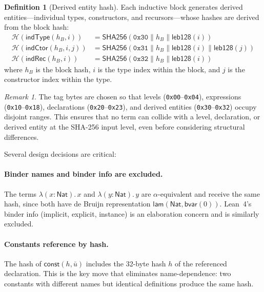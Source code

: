 \documentclass[11pt]{article}
\theoremstyle{definition}
\newtheorem{definition}{Definition}[section]
\theoremstyle{plain}
\theoremstyle{remark}
\newtheorem{remark}{Remark}[section]
\newcommand{\hash}{\mathcal{H}}
\newcommand{\SHA}{\textsf{SHA256}}
\newcommand{\Nat}{\textsf{Nat}}
\newcommand{\bvar}{\textsf{bvar}}
\newcommand{\const}{\textsf{const}}
\newcommand{\lam}{\textsf{lam}}
\newcommand{\concat}{\mathbin{\|}}
\begin{document}
\begin{definition}[Derived entity hash]
\label{def:hash-derived}
Each inductive block generates derived entities---individual types, constructors, and recursors---whose
hashes are derived from the block hash:
\begin{align*}
  \hash(\textsf{indType}(h_B, i)) &= \SHA(\mathtt{0x30} \concat h_B \concat \textsf{leb128}(i)) \\
  \hash(\textsf{indCtor}(h_B, i, j)) &= \SHA(\mathtt{0x31} \concat h_B \concat \textsf{leb128}(i) \concat \textsf{leb128}(j)) \\
  \hash(\textsf{indRec}(h_B, i)) &= \SHA(\mathtt{0x32} \concat h_B \concat \textsf{leb128}(i))
\end{align*}
where $h_B$ is the block hash, $i$ is the type index within the block, and $j$ is the constructor index within the type.
\end{definition}

\begin{remark}
The tag bytes are chosen so that levels (\texttt{0x00}--\texttt{0x04}),
expressions (\texttt{0x10}--\texttt{0x18}), declarations (\texttt{0x20}--\texttt{0x23}),
and derived entities (\texttt{0x30}--\texttt{0x32})
occupy disjoint ranges.
This ensures that no term can collide with a level, declaration, or derived entity at the SHA-256 input level,
even before considering structural differences.
\end{remark}

Several design decisions are critical:

\paragraph{Binder names and binder info are excluded.}
The terms $\lambda(x{:}\Nat).\,x$ and $\lambda(y{:}\Nat).\,y$ are $\alpha$-equivalent
and receive the same hash, since both have de Bruijn representation
$\lam(\Nat, \bvar(0))$.
Lean~4's binder info (implicit, explicit, instance) is an elaboration concern
and is similarly excluded.

\paragraph{Constants reference by hash.}
The hash of $\const(h, \bar{u})$ includes the 32-byte hash $h$ of the referenced declaration.
This is the key move that eliminates name-dependence: two constants with different names but
identical definitions produce the same hash.
\end{document}
